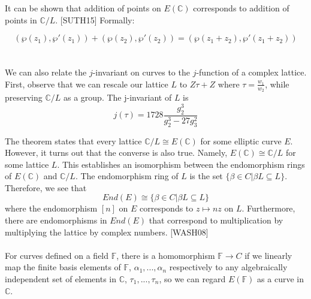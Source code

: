 \documentclass[12pt,twoside]{article}
\begin{document}
\noindent It can be shown that addition of points on $E(\mathbb C)$ corresponds to addition of points in $\mathbb C/L$. [SUTH15] Formally:

\begin{equation} 
(\wp(z_{1}), \wp'(z_{1})) + (\wp(z_{2}), \wp'(z_{2})) = (\wp(z_{1} + z_{2}), \wp'(z_{1} + z_{2})) 
\end{equation} \\ \\
\noindent  We can also relate the $j$-invariant on curves to the $j$-function of a complex lattice. First, observe that we can rescale our lattice $L$ to $Z\tau + Z$ where $\tau = \frac{w_{1}}{w_{2}}$, while preserving $\mathbb C/L$ as a group. The j-invariant of $L$ is
\begin{equation}
j(\tau) = 1728 \frac{g_{2}^{3}}{g_{2}^{3} - 27 g_{3}^{2}} 
\end{equation} 

 
\noindent The theorem states that every lattice $\mathbb C/L \cong E(\mathbb C)$ for some elliptic curve $E$. However, it turns out that the converse is also true. Namely, $E(\mathbb C) \cong \mathbb C/L$ for some lattice $L$. This establishes an isomorphism between the endomorphism rings of $E(\mathbb C)$ and $\mathbb C/L$. The endomorphism ring of $L$ is the set $\{ \beta \in C | \beta L \subseteq L \}$. Therefore, we see that
\begin{equation}
End(E) \cong \{ \beta \in C | \beta L \subseteq L \} 
\end{equation}  
where the endomorphism $[n]$ on $E$ corresponds to $z \mapsto nz$ on $L$. Furthermore, there are endomorphisms in $End(E)$ that correspond to multiplication by multiplying the lattice by complex numbers. [WASH08]
\\ \\
\noindent For curves defined on a field $\mathbb F$, there is a homomorphism $\mathbb F \rightarrow C$ if we linearly map the finite basis elements of $\mathbb F$, $\alpha_{1}, ...,\alpha_{n}$ respectively to any algebraically independent set of elements in $\mathbb{C}$, $\tau_{1},..., \tau_{n}$, so we can regard $E(\mathbb F)$ as a curve in $\mathbb{C}$.  
\end{document}
